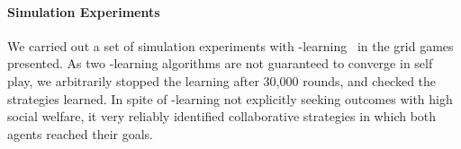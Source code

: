 
\vspace{\up}
\paragraph{Simulation Experiments}
\label{sec:qlearning}

We carried out a set of simulation experiments
with \Q-learning~\cite{Watkins92} in the grid games presented.
%
As two \Q-learning algorithms are not guaranteed to converge in self
play, we arbitrarily stopped the learning after 30,000 rounds, and
checked the strategies learned.  In spite of \Q-learning not
explicitly seeking outcomes with high social welfare, it very reliably
identified collaborative strategies in which both agents reached their
goals.

